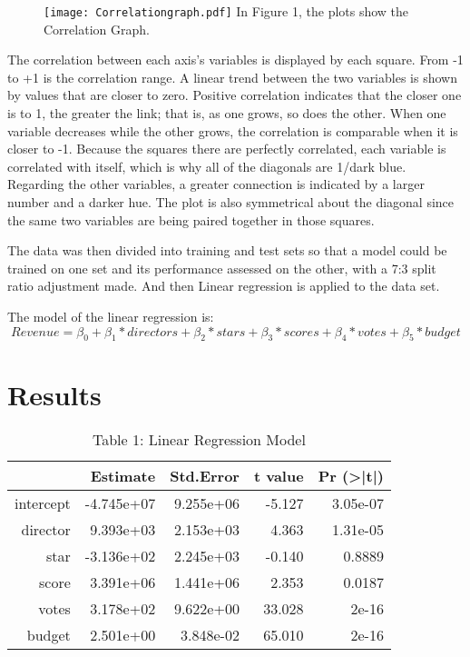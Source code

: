 \documentclass[12pt]{article}
\begin{document}
\begin{figure}
  \centering
	\texttt{[image: Correlationgraph.pdf]}
	\label{fig:Correlationgraph}
In Figure 1, the plots show the Correlation Graph.
\end{figure}

The correlation between each axis’s variables is displayed by each square. From 
-1 to +1 is the correlation range. A linear trend between the two variables is shown
by values that are closer to zero. Positive correlation indicates that the closer one 
is to 1, the greater the link; that is, as one grows, so does the other. When one variable 
decreases while the other grows, the correlation is comparable when it is closer to -1.
Because the squares there are perfectly correlated, each variable is correlated with itself,
which is why all of the diagonals are 1/dark blue. Regarding the other variables, a greater 
connection is indicated by a larger number and a darker hue. The plot is also symmetrical
about the diagonal since the same two variables are being paired together in those squares.

The data was then divided into training and test sets so that a model could be 
trained on one set and its performance assessed on the other, with a 7:3 split 
ratio adjustment made. And then Linear regression is applied to 
the data set.

The model of the linear regression is:
\begin{equation}
 Revenue = \beta_0 + \beta_1 * directors + \beta_2 * stars + \beta_3 * scores + \beta_4 *votes + \beta_5* budget 
\end{equation}

\section{Results}
\label{sec:res}

\begin{table}[h]
\caption{Table 1: Linear Regression Model}
\centering
\begin{tabular}{rrrrr}
\hline
 & Estimate   & Std.Error & t value & Pr (\textgreater|t|) \\
 \hline
intercept & -4.745e+07 & 9.255e+06 & -5.127  & 3.05e-07 \\ 
director  & 9.393e+03  & 2.153e+03 & 4.363   & 1.31e-05 \\ 
star      & -3.136e+02 & 2.245e+03 & -0.140  & 0.8889 \\ 
score     & 3.391e+06  & 1.441e+06 & 2.353   & 0.0187 \\ 
votes     & 3.178e+02  & 9.622e+00 & 33.028  & 2e-16 \\ 
budget    & 2.501e+00  & 3.848e-02 & 65.010  & 2e-16 \\
\hline
\end{tabular}
\end{table}
\end{document}
